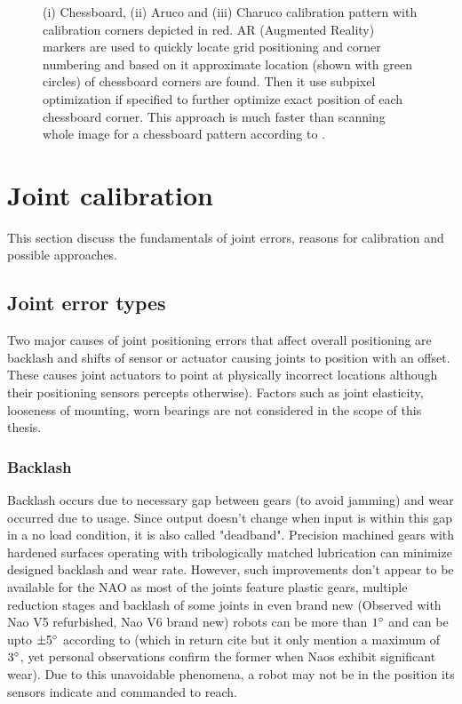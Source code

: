 \documentclass[english, printversion, nomenclature, notitle]{tuvisionthesis} %
\begin{document}
\begin{center}
\begin{figure}
	\def\svgwidth{\linewidth}
	
	\caption{(i) Chessboard, (ii) Aruco and (iii) Charuco calibration pattern with calibration corners depicted in red. AR (Augmented Reality) markers are used to quickly locate grid positioning and corner numbering and based on it approximate location (shown with green circles) of chessboard corners are found. Then it use subpixel optimization if specified to further optimize exact position of each chessboard corner. This approach is much faster than scanning whole image for a chessboard pattern according to \cite{romero-ramirez_speeded_2018}.}
	\label{fig:charuco}
\end{figure}
\end{center}

\section{Joint calibration}
This section discuss the fundamentals of joint errors, reasons for calibration and possible approaches.

\subsection{Joint error types}

Two major causes of joint positioning errors that affect overall positioning are backlash and shifts of sensor or actuator causing joints to position with an offset. These causes joint actuators to point at physically incorrect locations although their positioning sensors percepts otherwise). Factors such as joint elasticity, looseness of mounting, worn bearings are not considered in the scope of this thesis.

\subsubsection{Backlash}
\label{subsec:backlash}
Backlash occurs due to necessary gap between gears (to avoid jamming) and wear occurred due to usage. Since output doesn't change when input is within this gap in a no load condition, it is also called "deadband". Precision machined gears with hardened surfaces operating with tribologically matched lubrication can minimize designed backlash and wear rate. However, such improvements don't appear to be available for the NAO as most of the joints feature plastic gears, multiple reduction stages and backlash of some joints in even brand new (Observed with Nao V5 refurbished, Nao V6 brand new) robots can be more than $1\degree$ and can be upto $\pm 5\degree$ according to \cite{hutchison_automatic_2015} (which in return cite \cite{gouaillier_nao_2008} but it only mention a maximum of $3\degree$, yet personal observations confirm the former when Naos exhibit significant wear). Due to this unavoidable phenomena, a robot may not be in the position its sensors indicate and commanded to reach.
\end{document}
